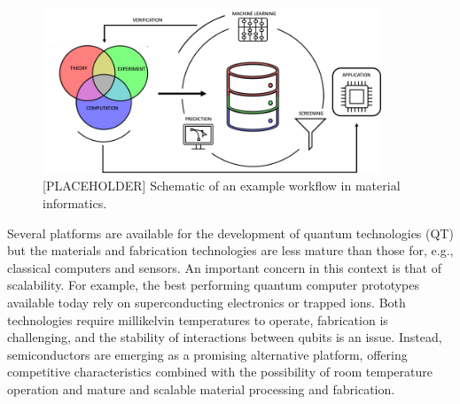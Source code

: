 \documentclass[superscriptaddress,unsortedaddress,
 amsmath,amssymb,
 aps,
]{revtex4-2}
\newcommand{\marianne}[1]{\textcolor{blue}{#1}}
\begin{document}
\begin{figure}[t]
    \centering
    \includegraphics[width=0.9\textwidth]{figures/ht-workflow-new.png}
    \caption{[PLACEHOLDER] Schematic of an example workflow in material informatics. 
    }
    \label{fig:ht-workflow}
\end{figure}

Several platforms are available for the development of quantum technologies (QT) but the materials and fabrication technologies are less mature than those for, e.g., classical computers and sensors. 
An important concern in this context is that of scalability. 
For example, the best performing quantum computer prototypes available today rely on superconducting electronics or trapped ions. Both technologies require millikelvin temperatures to operate, fabrication is challenging, and the stability of interactions between qubits is an issue. Instead, semiconductors are emerging as a promising alternative platform, offering competitive characteristics combined with the possibility of room temperature operation and mature and scalable material processing and fabrication.  
\end{document}
